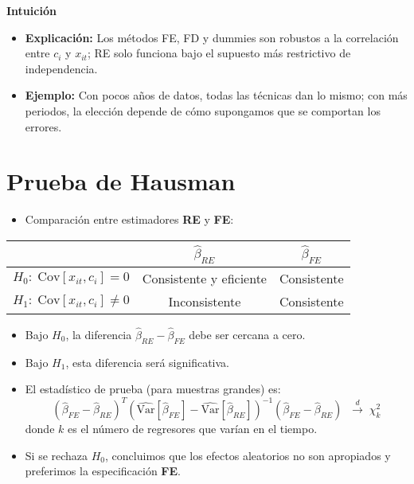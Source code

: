 \documentclass[12pt]{article}
\begin{document}
\noindent\textbf{Intuición}
\begin{itemize}
    \item \textbf{Explicación:} Los métodos FE, FD y dummies son robustos a la correlación entre $c_i$ y $x_{it}$; RE solo funciona bajo el supuesto más restrictivo de independencia.
    \item \textbf{Ejemplo:} Con pocos años de datos, todas las técnicas dan lo mismo; con más periodos, la elección depende de cómo supongamos que se comportan los errores.
\end{itemize}

\section*{\noindent\textbf{Prueba de Hausman}}

\begin{itemize}
    \item Comparación entre estimadores \textbf{RE} y \textbf{FE}:
\end{itemize}

\begin{table}[H]
\centering
\begin{tabular}{lcc}
\hline
 & $\hat{\beta}_{RE}$ & $\hat{\beta}_{FE}$ \\
\hline
$H_0: \; \text{Cov}[x_{it}, c_i] = 0$ & Consistente y eficiente & Consistente \\
$H_1: \; \text{Cov}[x_{it}, c_i] \neq 0$ & Inconsistente & Consistente \\
\hline
\end{tabular}
\end{table}

\begin{itemize}
    \item Bajo $H_0$, la diferencia $\hat{\beta}_{RE} - \hat{\beta}_{FE}$ debe ser cercana a cero.
    \item Bajo $H_1$, esta diferencia será significativa.
    
    \item El estadístico de prueba (para muestras grandes) es:
    \[
    (\hat{\beta}_{FE} - \hat{\beta}_{RE})^T 
    \left( \widehat{\text{Var}}[\hat{\beta}_{FE}] - \widehat{\text{Var}}[\hat{\beta}_{RE}] \right)^{-1} 
    (\hat{\beta}_{FE} - \hat{\beta}_{RE})
    \;\; \overset{d}{\longrightarrow} \; \chi^2_k
    \]
    donde $k$ es el número de regresores que varían en el tiempo.
    
    \item Si se rechaza $H_0$, concluimos que los efectos aleatorios no son apropiados y preferimos la especificación \textbf{FE}.
\end{itemize}
\end{document}
